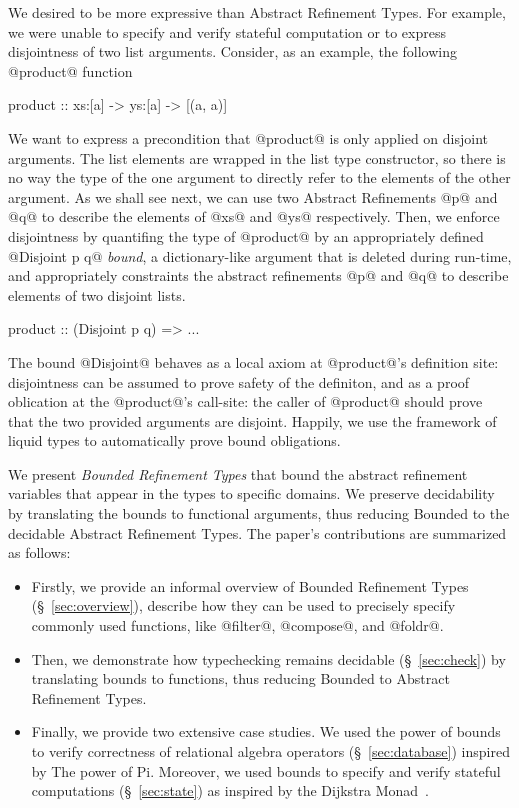 We desired to be more expressive than Abstract Refinement Types.
For example, we were unable to specify and verify stateful computation 
or to express disjointness of two list arguments.
%
Consider, as an example, the following @product@ function
\begin{code}
product :: xs:[a] -> ys:[a] -> [(a, a)]
\end{code}
We want to express a precondition that @product@ is only applied on disjoint arguments.
%
The list elements are wrapped in the list type constructor, 
so there is no way the type of the one argument to directly refer
to the elements of the other argument.
%
As we shall see next, we can use two Abstract Refinements @p@ and @q@ 
to describe the elements of @xs@ and @ys@ respectively. 
%
Then, we enforce disjointness by quantifing  the type of @product@ by
an appropriately defined @Disjoint p q@ \textit{bound}, 
\ie a dictionary-like argument that is deleted during run-time, 
and appropriately constraints the abstract refinements @p@ and @q@ to 
describe elements of two disjoint lists. 
\begin{code}
product :: (Disjoint p q) => ...
\end{code}
%
The bound @Disjoint@ behaves as a local axiom at @product@'s definition site: 
disjointness can be assumed to prove safety of the definiton, 
and as a proof oblication at the @product@'s call-site:
the caller of  @product@ should prove that the two provided arguments are disjoint. 
%
Happily, we use the framework of liquid types to automatically prove bound obligations.


We present \textit{Bounded Refinement Types} that bound the 
abstract refinement variables that appear in the types 
to specific domains.
%
We preserve decidability by translating the bounds to functional arguments,
thus reducing Bounded to the decidable Abstract Refinement Types.
%
The paper's contributions are summarized as follows:
\begin{itemize}
\item Firstly, we provide an informal overview of Bounded Refinement Types (\S~\ref{sec:overview}), 
      describe how they can be used to precisely specify commonly used \haskell functions, 
      like @filter@, @compose@, and @foldr@.
\item Then, we demonstrate how typechecking remains decidable (\S~\ref{sec:check}) 
      by translating bounds to functions, thus reducing Bounded to Abstract Refinement Types. 
\item Finally, we provide two extensive case studies. 
      We used the power of bounds to verify correctness of relational algebra
      operators (\S~\ref{sec:database}) inspired by The power of Pi\citep{thepipower}. 
      Moreover, we used bounds to specify and verify stateful computations (\S~\ref{sec:state})
      as inspired by the Dijkstra Monad~\citep{dijkstramonad}.
\end{itemize}

